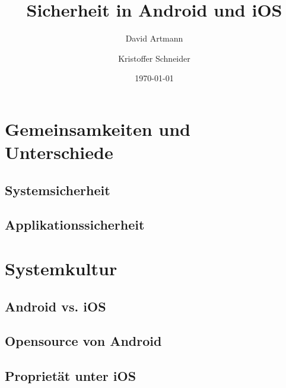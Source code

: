 \documentclass{beamer}
\title{Sicherheit in Android und iOS}
\author{David Artmann\inst{1} \and Kristoffer Schneider\inst{1}}
\institute[Universities of]
{
\inst{1}
Hochschule für angewandte Wissenschaften\\
Würzburg-Schweinfurt
}
\date{\today}
\begin{document}





\section{Gemeinsamkeiten und Unterschiede}
	\subsection[Systemsicherheit]{Systemsicherheit}
		
	\subsection[Applikationssicherheit]{Applikationssicherheit}
		
		
		
		
\section{Systemkultur}
	\subsection{Android vs. iOS}
		
	\subsection{Opensource von Android}
	\subsection{Proprietät unter iOS}
		
	
\end{document}

